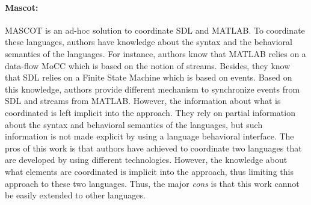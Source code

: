  
{\paragraph{Mascot: }
MASCOT is an ad-hoc solution to coordinate SDL and MATLAB. To coordinate these languages, authors have knowledge about the syntax and the behavioral semantics of the languages. For instance, authors know that MATLAB relies on a data-flow MoCC which is based on the notion of streams. Besides, they know that SDL relies on a Finite State Machine which is based on events. Based on this knowledge, authors provide different mechanism to synchronize events from SDL and streams from MATLAB. However, the information about what is coordinated is left implicit into the approach. They rely on partial information about the syntax and behavioral semantics of the languages, but such information is not made explicit by using a language behavioral interface. The pros of this work is that authors have achieved to coordinate two languages that are developed by using different technologies. However, the knowledge about what elements are coordinated is implicit into the approach, thus limiting this approach to these two languages. Thus, the major \emph{cons} is that this work cannot be easily extended to other languages. 
	



}
